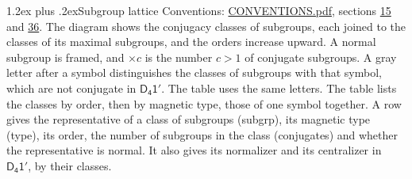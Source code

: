 \documentclass[10pt,a4paper]{article}
\makeatletter
\renewcommand\section{\@startsection{section}{1}{\z@}{-3ex plus -1ex minus -.2ex}%
  {1.2ex plus .2ex}{\normalfont\large\sffamily\bfseries\color{parttitle}}}
\numberwithin{equation}{section}
\newcommand{\grp}[1]{\mathsf{#1}}
\makeatother
\begin{document}
\section{Subgroup lattice}\label{s:subgroups}
Conventions: \href{../../CONVENTIONS.pdf}{CONVENTIONS.pdf}, sections \href{../../../rotation/CONVENTIONS.pdf\#conv.15}{15} and \href{../../CONVENTIONS.pdf\#conv.36}{36}.
The diagram shows the conjugacy classes of subgroups, each joined to the classes of its maximal subgroups, and the orders increase upward. \label{n:index.conjugates.c}\label{n:mark.conjugates}A normal subgroup is framed, and ${\times}c$ is the number $c > 1$ of conjugate subgroups. \label{n:mark.letter}A gray letter after a symbol distinguishes the classes of subgroups with that symbol, which are not conjugate in $\grp{D_{4}1'}$. The table uses the same letters. The table lists the classes by order, then by magnetic type, those of one symbol together. \label{n:head.subgroup}\label{n:head.magnetic.type}\label{n:head.order}\label{n:head.conjugates}\label{n:head.normal}A row gives the representative of a class of subgroups (subgrp), its magnetic type (type), its order, the number of subgroups in the class (conjugates) and whether the representative is normal. \label{n:head.normalizer}\label{n:head.centralizer}It also gives its normalizer and its centralizer in $\grp{D_{4}1'}$, by their classes. 
\end{document}
